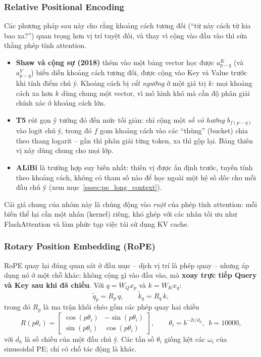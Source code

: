 \subsubsection{Relative Positional Encoding}
Các phương pháp sau này cho rằng khoảng cách tương đối (“từ này cách từ kia bao xa?”) quan trọng hơn vị trí tuyệt đối, và thay vì cộng vào đầu vào thì sửa thẳng phép tính attention.
\begin{itemize}
    \item \textbf{Shaw và cộng sự (2018)} \cite{shaw2018self} thêm vào một bảng vector học được $a^K_{p-q}$ (và $a^V_{p-q}$) biểu diễn khoảng cách tương đối, được cộng vào Key và Value trước khi tính điểm chú ý. Khoảng cách bị \emph{cắt ngưỡng} ở một giá trị $k$: mọi khoảng cách xa hơn $k$ dùng chung một vector, vì mô hình khó mà cần độ phân giải chính xác ở khoảng cách lớn.
    \item \textbf{T5} \cite{raffel2020exploring} rút gọn ý tưởng đó đến mức tối giản: chỉ cộng một \emph{số vô hướng} $b_{f(p-q)}$ vào logit chú ý, trong đó $f$ gom khoảng cách vào các “thùng” (bucket) chia theo thang logarit -- gần thì phân giải từng token, xa thì gộp lại. Bảng thiên vị này dùng chung cho mọi lớp.
    \item \textbf{ALiBi} \cite{press2021train} là trường hợp suy biến nhất: thiên vị được ấn định trước, tuyến tính theo khoảng cách, không có tham số nào để học ngoài một hệ số dốc cho mỗi đầu chú ý (xem mục~\ref{sssec:pe_long_context}).
\end{itemize}
Cái giá chung của nhóm này là chúng động vào \emph{ruột} của phép tính attention: mỗi biến thể lại cần một nhân (kernel) riêng, khó ghép với các nhân tối ưu như FlashAttention và làm phức tạp việc tái sử dụng KV cache.

\subsubsection{Rotary Position Embedding (RoPE)}
\label{sssec:rope}
RoPE \cite{su2021roformer} quay lại đúng quan sát ở đầu mục -- dịch vị trí là phép quay -- nhưng áp dụng nó ở một chỗ khác: không cộng gì vào đầu vào, mà \textbf{xoay trực tiếp Query và Key sau khi đã chiếu}. Với $q = W_Q x_p$ và $k = W_K x_q$:
\[
\tilde{q}_p = R_p \, q, \qquad \tilde{k}_q = R_q \, k,
\]
trong đó $R_p$ là ma trận khối chéo gồm các phép quay hai chiều
\[
R(p\theta_i) = \begin{bmatrix} \cos(p\theta_i) & -\sin(p\theta_i) \\ \sin(p\theta_i) & \cos(p\theta_i) \end{bmatrix}, \qquad \theta_i = b^{-2i/d_h},\ \ b = 10000 ,
\]
với $d_h$ là số chiều của một đầu chú ý. Các tần số $\theta_i$ giống hệt các $\omega_i$ của sinusoidal PE; chỉ có chỗ tác động là khác.

